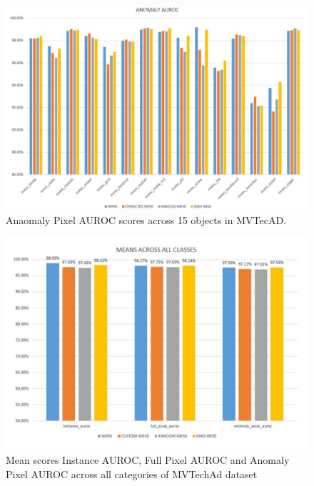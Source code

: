\begin{figure}[h]
	\begin{center}
		\includegraphics[width=1.0\linewidth]{Chapter_4/wd_anomaly.png}
	\end{center}
	\caption{Anaomaly Pixel AUROC scores across 15 objects in MVTecAD.}
	\label{fig:wd_anomaly}
\end{figure}

\begin{figure}[h]
	\begin{center}
		\includegraphics[width=1.0\linewidth]{Chapter_4/wd_mean.png}
	\end{center}
	\caption{Mean scores Instance AUROC, Full Pixel AUROC and Anomaly Pixel AUROC across all categories of MVTechAd dataset}
	\label{fig:wd_mean}
\end{figure}

